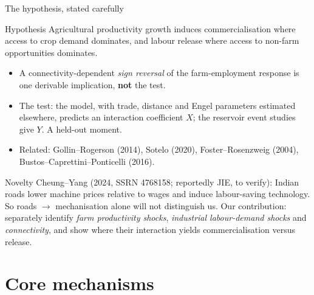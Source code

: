\documentclass[10pt,aspectratio=169]{beamer}
\newcommand{\hl}[1]{\textcolor{mOrange}{#1}}
\begin{document}
\begin{frame}{The hypothesis, stated carefully}
  \begin{block}{Hypothesis}
    Agricultural productivity growth induces \hl{commercialisation} where access to crop
    demand dominates, and \hl{labour release} where access to non-farm opportunities
    dominates.
  \end{block}
  \footnotesize
  \begin{itemize}
    \item A connectivity-dependent \emph{sign reversal} of the farm-employment response is
          one derivable implication, \textbf{not} the test.
    \item The test: the model, with trade, distance and Engel parameters estimated
          elsewhere, predicts an interaction coefficient $X$; the reservoir event studies
          give $Y$. A \hl{held-out moment}.
    \item Related: Gollin--Rogerson (2014), Sotelo (2020), Foster--Rosenzweig (2004),
          Bustos--Caprettini--Ponticelli (2016).
  \end{itemize}
  \begin{exampleblock}{Novelty}
    \footnotesize
    Cheung--Yang (2024, SSRN 4768158; reportedly JIE, to verify): Indian roads lower
    machine prices relative to wages and induce labour-saving technology. So
    roads $\to$ mechanisation alone will not distinguish us. Our contribution: separately
    identify \emph{farm productivity shocks}, \emph{industrial labour-demand shocks} and
    \emph{connectivity}, and show where their interaction yields commercialisation versus
    release.
  \end{exampleblock}
\end{frame}

\section{Core mechanisms}
\end{document}
